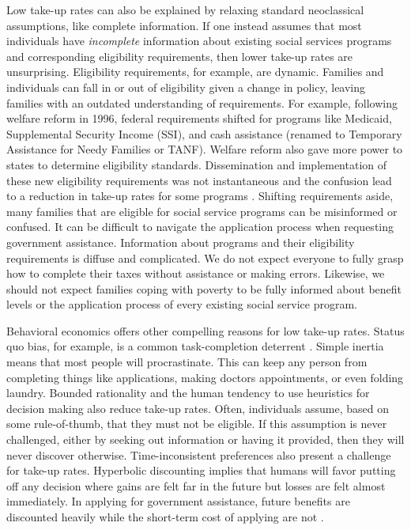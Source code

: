 \documentclass[12pt,letterpaperpaper,]{book}
\begin{document}
Low take-up rates can also be explained by relaxing standard
neoclassical assumptions, like complete information. If one instead
assumes that most individuals have \emph{incomplete} information about
existing social services programs and corresponding eligibility
requirements, then lower take-up rates are unsurprising. Eligibility
requirements, for example, are dynamic. Families and individuals can
fall in or out of eligibility given a change in policy, leaving families
with an outdated understanding of requirements. For example, following
welfare reform in 1996, federal requirements shifted for programs like
Medicaid, Supplemental Security Income (SSI), and cash assistance
(renamed to Temporary Assistance for Needy Families or TANF). Welfare
reform also gave more power to states to determine eligibility
standards. Dissemination and implementation of these new eligibility
requirements was not instantaneous and the confusion lead to a reduction
in take-up rates for some programs \citep{stuber_stigma_2004}. Shifting
requirements aside, many families that are eligible for social service
programs can be misinformed or confused. It can be difficult to navigate
the application process when requesting government assistance.
Information about programs and their eligibility requirements is diffuse
and complicated. We do not expect everyone to fully grasp how to
complete their taxes without assistance or making errors. Likewise, we
should not expect families coping with poverty to be fully informed
about benefit levels or the application process of every existing social
service program.

Behavioral economics offers other compelling reasons for low take-up
rates. Status quo bias, for example, is a common task-completion
deterrent \citep{kahneman_anomalies:_1991}. Simple inertia means that
most people will procrastinate. This can keep any person from completing
things like applications, making doctors appointments, or even folding
laundry. Bounded rationality and the human tendency to use heuristics
for decision making also reduce take-up rates. Often, individuals
assume, based on some rule-of-thumb, that they must not be eligible. If
this assumption is never challenged, either by seeking out information
or having it provided, then they will never discover otherwise.
Time-inconsistent preferences also present a challenge for take-up
rates. Hyperbolic discounting implies that humans will favor putting off
any decision where gains are felt far in the future but losses are felt
almost immediately. In applying for government assistance, future
benefits are discounted heavily while the short-term cost of applying
are not \citep{currie_take-up_2006}.
\end{document}
